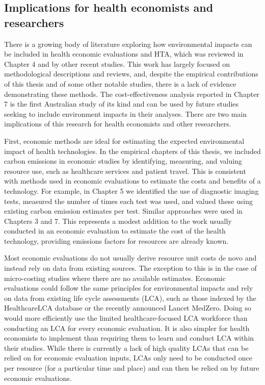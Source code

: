 \begin{refsection}
\subsection{Implications for health economists and researchers}
There is a growing body of literature exploring how environmental impacts can be included in health economic evaluations and HTA, which was reviewed in Chapter 4 and by other recent studies.\cite{polisena_environmental_2018, pinho-gomes_incorporating_2022, guirado-fuentes_main_2023, desterbecq_inclusion_2023, antonazzo_health_2025} This work has largely focused on methodological descriptions and reviews, and, despite the empirical contributions of this thesis and of some other notable studies,\cite{de_preux_beyond_2018, kindred_exploratory_2024, dunbar_balancing_2025, marsh_incorporating_2016, kingma_exploring_2025} there is a lack of evidence demonstrating these methods. The cost-effectiveness analysis reported in Chapter 7 is the first Australian study of its kind and can be used by future studies seeking to include environment impacts in their analyses. There are two main implications of this research for health economists and other researchers.

First, economic methods are ideal for estimating the expected environmental impact of health technologies. In the empirical chapters of this thesis, we included carbon emissions in economic studies by identifying, measuring, and valuing resource use, such as healthcare services and patient travel. This is consistent with methods used in economic evaluations to estimate the costs and benefits of a technology.\cite{drummond_methods_2015} For example, in Chapter 5 we identified the use of diagnostic imaging tests, measured the number of times each test was used, and valued these using existing carbon emission estimates per test. Similar approaches were used in Chapters 3 and 7. This represents a modest addition to the work usually conducted in an economic evaluation to estimate the cost of the health technology, providing emissions factors for resources are already known.

Most economic evaluations do not usually derive resource unit costs de novo and instead rely on data from existing sources. The exception to this is in the case of micro-costing studies where there are no available estimates. Economic evaluations could follow the same principles for environmental impacts and rely on data from existing life cycle assessments (LCA), such as those indexed by the HealthcareLCA database or the recently announced Lancet MedZero.\cite{drew_healthcarelca_2025, watts_lancet_2025} Doing so would more efficiently use the limited healthcare-focused LCA workforce than conducting an LCA for every economic evaluation. It is also simpler for health economists to implement than requiring them to learn and conduct LCA within their studies. While there is currently a lack of high quality LCAs that can be relied on for economic evaluation inputs, LCAs only need to be conducted once per resource (for a particular time and place) and can then be relied on by future economic evaluations. 


\end{refsection}
